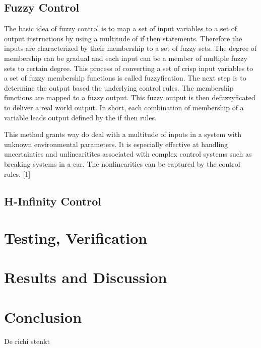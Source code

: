 \documentclass[conference]{IEEEtran}
\begin{document}
\subsection{Fuzzy Control}
The basic idea of fuzzy control is to map a set of input variables to a set of output instructions
by using a multitude of if then statements. Therefore the inputs are characterized by their
membership to a set of fuzzy sets. The degree of membership can be gradual and each input can 
be a member of multiple fuzzy sets to certain degree. This process of converting a set of crisp
input variables to a set of fuzzy membership functions is called fuzzyfication. The next step
is to determine the output based the underlying control rules. The membership functions are
mapped to a fuzzy output. This fuzzy output is then defuzzyficated to deliver a real world output.
In short, each combination of membership of a variable leads output defined by the if then rules.

This method grants way do deal with a multitude of inputs in a system with unknown environmental
parameters. It is especially effective at handling uncertainties and unlinearitites associated
with complex control systems such as breaking systems in a car. The nonlinearities can be 
captured by the control rules.
[1]
\subsection{H-Infinity Control}

\section{Testing, Verification}


\section{Results and Discussion}




\section{Conclusion}

De richi stenkt 
\end{document}
